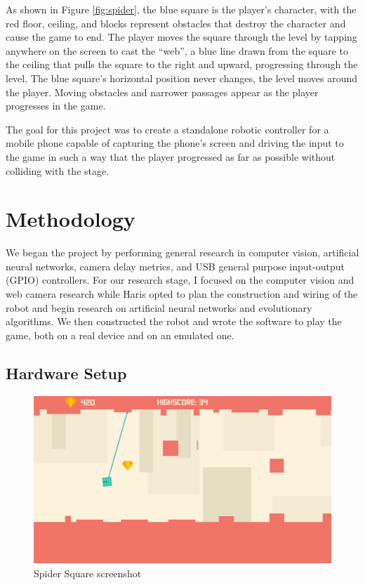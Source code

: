 \documentclass[twocolumn,a4paper,12pt]{article}
\begin{document}
As shown in Figure \ref{fig:spider}, the blue square is the player's character,
with the red floor, ceiling, and blocks represent obstacles that destroy the
character and cause the game to end. The player moves the square through the
level by tapping anywhere on the screen to cast the ``web'', a blue line drawn
from the square to the ceiling that pulls the square to the right and upward,
progressing through the level. The blue square's horizontal position never
changes, the level moves around the player. Moving obstacles and narrower
passages appear as the player progresses in the game.

The goal for this project was to create a standalone robotic controller for a
mobile phone capable of capturing the phone's screen and driving the input to
the game in such a way that the player progressed as far as possible without
colliding with the stage.

\section{Methodology}

We began the project by performing general research in computer vision,
artificial neural networks, camera delay metrics, and USB general purpose
input-output (GPIO) controllers. For our research stage, I focused on the
computer vision and web camera research while Haris opted to plan the
construction and wiring of the robot and begin research on artificial neural
networks and evolutionary algorithms. We then constructed the robot and wrote
the software to play the game, both on a real device and on an emulated one.

\subsection{Hardware Setup}

\begin{figure}[t]
    \centering
    \includegraphics[width=\linewidth]{spider.png}
    \caption{Spider Square screenshot}
    \label{fig:lego}
\end{figure}
\end{document}
